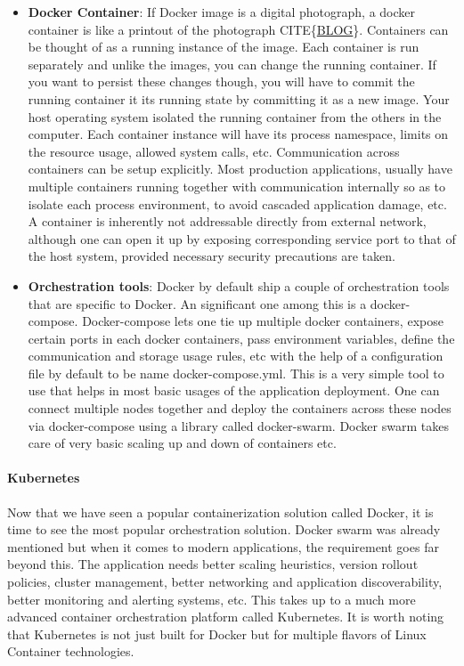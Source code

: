 \documentclass[12pt,titlepage]{article}
\begin{document}
\begin{itemize}
\item \textbf{Docker Container}: If Docker image is a digital photograph, a docker container is like a printout
of the photograph CITE\{\href{https://stackify.com/docker-image-vs-container-everything-you-need-to-know/}{BLOG}\}. Containers can be thought of as a running instance
of the image. Each container is run separately and unlike the images, you can
change the running container. If you want to persist these changes though, you
will have to commit the running container it its running state by committing it
as a new image. Your host operating system isolated the running container from
the others in the computer. Each container instance will have its process
namespace, limits on the resource usage, allowed system calls, etc.
Communication across containers can be setup explicitly. Most production
applications, usually have multiple containers running together with
communication internally so as to isolate each process environment, to avoid
cascaded application damage, etc. A container is inherently not addressable
directly from external network, although one can open it up by exposing
corresponding service port to that of the host system, provided necessary
security precautions are taken.

\item \textbf{Orchestration tools}: Docker by default ship a couple of orchestration tools that are specific to
Docker. An significant one among this is a docker-compose. Docker-compose lets
one tie up multiple docker containers, expose certain ports in each docker
containers, pass environment variables, define the communication and storage
usage rules, etc with the help of a configuration file by default to be name
docker-compose.yml. This is a very simple tool to use that helps in most basic
usages of the application deployment. One can connect multiple nodes together
and deploy the containers across these nodes via docker-compose using a library
called docker-swarm. Docker swarm takes care of very basic scaling up and down
of containers etc.
\end{itemize}

\paragraph{Kubernetes}
\label{sec:org752e263}
Now that we have seen a popular containerization solution called Docker, it is
time to see the most popular orchestration solution. Docker swarm was already
mentioned but when it comes to modern applications, the requirement goes far
beyond this. The application needs better scaling heuristics, version rollout
policies, cluster management, better networking and application discoverability,
better monitoring and alerting systems, etc. This takes up to a much more
advanced container orchestration platform called Kubernetes. It is worth noting
that Kubernetes is not just built for Docker but for multiple flavors of Linux
Container technologies.
\end{document}
